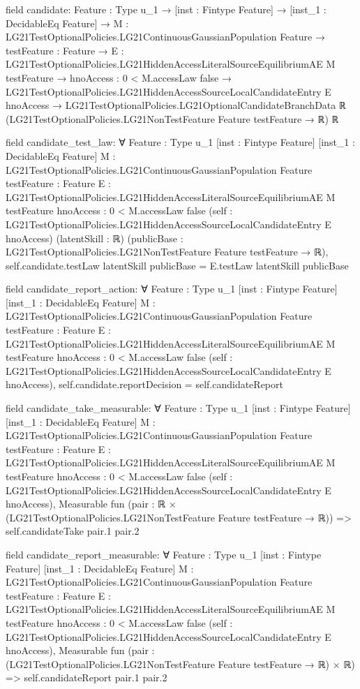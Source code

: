 \documentclass[10pt]{article}
\begin{document}
\begin{ReviewVerbatim}
field candidate:
{Feature : Type u_1} →
  [inst : Fintype Feature] →
    [inst_1 : DecidableEq Feature] →
      {M : LG21TestOptionalPolicies.LG21ContinuousGaussianPopulation Feature} →
        {testFeature : Feature} →
          {E : LG21TestOptionalPolicies.LG21HiddenAccessLiteralSourceEquilibriumAE M testFeature} →
            {hnoAccess : 0 < M.accessLaw {false}} →
              LG21TestOptionalPolicies.LG21HiddenAccessSourceLocalCandidateEntry E hnoAccess →
                LG21TestOptionalPolicies.LG21OptionalCandidateBranchData ℝ
                  (LG21TestOptionalPolicies.LG21NonTestFeature Feature testFeature → ℝ) ℝ

field candidate_test_law:
∀ {Feature : Type u_1} [inst : Fintype Feature] [inst_1 : DecidableEq Feature]
  {M : LG21TestOptionalPolicies.LG21ContinuousGaussianPopulation Feature} {testFeature : Feature}
  {E : LG21TestOptionalPolicies.LG21HiddenAccessLiteralSourceEquilibriumAE M testFeature}
  {hnoAccess : 0 < M.accessLaw {false}}
  (self : LG21TestOptionalPolicies.LG21HiddenAccessSourceLocalCandidateEntry E hnoAccess) (latentSkill : ℝ)
  (publicBase : LG21TestOptionalPolicies.LG21NonTestFeature Feature testFeature → ℝ),
  self.candidate.testLaw latentSkill publicBase = E.testLaw latentSkill publicBase

field candidate_report_action:
∀ {Feature : Type u_1} [inst : Fintype Feature] [inst_1 : DecidableEq Feature]
  {M : LG21TestOptionalPolicies.LG21ContinuousGaussianPopulation Feature} {testFeature : Feature}
  {E : LG21TestOptionalPolicies.LG21HiddenAccessLiteralSourceEquilibriumAE M testFeature}
  {hnoAccess : 0 < M.accessLaw {false}}
  (self : LG21TestOptionalPolicies.LG21HiddenAccessSourceLocalCandidateEntry E hnoAccess),
  self.candidate.reportDecision = self.candidateReport

field candidate_take_measurable:
∀ {Feature : Type u_1} [inst : Fintype Feature] [inst_1 : DecidableEq Feature]
  {M : LG21TestOptionalPolicies.LG21ContinuousGaussianPopulation Feature} {testFeature : Feature}
  {E : LG21TestOptionalPolicies.LG21HiddenAccessLiteralSourceEquilibriumAE M testFeature}
  {hnoAccess : 0 < M.accessLaw {false}}
  (self : LG21TestOptionalPolicies.LG21HiddenAccessSourceLocalCandidateEntry E hnoAccess),
  Measurable fun (pair : ℝ × (LG21TestOptionalPolicies.LG21NonTestFeature Feature testFeature → ℝ)) =>
    self.candidateTake pair.1 pair.2

field candidate_report_measurable:
∀ {Feature : Type u_1} [inst : Fintype Feature] [inst_1 : DecidableEq Feature]
  {M : LG21TestOptionalPolicies.LG21ContinuousGaussianPopulation Feature} {testFeature : Feature}
  {E : LG21TestOptionalPolicies.LG21HiddenAccessLiteralSourceEquilibriumAE M testFeature}
  {hnoAccess : 0 < M.accessLaw {false}}
  (self : LG21TestOptionalPolicies.LG21HiddenAccessSourceLocalCandidateEntry E hnoAccess),
  Measurable fun (pair : (LG21TestOptionalPolicies.LG21NonTestFeature Feature testFeature → ℝ) × ℝ) =>
    self.candidateReport pair.1 pair.2


\end{ReviewVerbatim}
\end{document}
